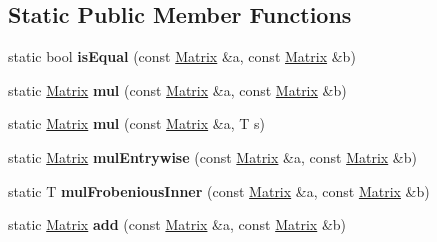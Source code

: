 \subsection*{Static Public Member Functions}
\begin{DoxyCompactItemize}
\item 
\hypertarget{classps_1_1base_1_1Matrix_a10b22b0d13369c4c9f5f882027a8916b}{}static bool {\bfseries is\+Equal} (const \hyperlink{classps_1_1base_1_1Matrix}{Matrix} \&a, const \hyperlink{classps_1_1base_1_1Matrix}{Matrix} \&b)\label{classps_1_1base_1_1Matrix_a10b22b0d13369c4c9f5f882027a8916b}

\item 
\hypertarget{classps_1_1base_1_1Matrix_ab540c9e3d4e67e7d09bd422b20585bdc}{}static \hyperlink{classps_1_1base_1_1Matrix}{Matrix} {\bfseries mul} (const \hyperlink{classps_1_1base_1_1Matrix}{Matrix} \&a, const \hyperlink{classps_1_1base_1_1Matrix}{Matrix} \&b)\label{classps_1_1base_1_1Matrix_ab540c9e3d4e67e7d09bd422b20585bdc}

\item 
\hypertarget{classps_1_1base_1_1Matrix_a48be2a8dd4b536d9ecaf2d755cbcdaf6}{}static \hyperlink{classps_1_1base_1_1Matrix}{Matrix} {\bfseries mul} (const \hyperlink{classps_1_1base_1_1Matrix}{Matrix} \&a, T s)\label{classps_1_1base_1_1Matrix_a48be2a8dd4b536d9ecaf2d755cbcdaf6}

\item 
\hypertarget{classps_1_1base_1_1Matrix_ad2344ec58c513d6a410bc021e194bdab}{}static \hyperlink{classps_1_1base_1_1Matrix}{Matrix} {\bfseries mul\+Entrywise} (const \hyperlink{classps_1_1base_1_1Matrix}{Matrix} \&a, const \hyperlink{classps_1_1base_1_1Matrix}{Matrix} \&b)\label{classps_1_1base_1_1Matrix_ad2344ec58c513d6a410bc021e194bdab}

\item 
\hypertarget{classps_1_1base_1_1Matrix_ae31ef8d82acb14fe6a165d311ea8a679}{}static T {\bfseries mul\+Frobenious\+Inner} (const \hyperlink{classps_1_1base_1_1Matrix}{Matrix} \&a, const \hyperlink{classps_1_1base_1_1Matrix}{Matrix} \&b)\label{classps_1_1base_1_1Matrix_ae31ef8d82acb14fe6a165d311ea8a679}

\item 
\hypertarget{classps_1_1base_1_1Matrix_aa68c052f6db96632e13fa471b57713c8}{}static \hyperlink{classps_1_1base_1_1Matrix}{Matrix} {\bfseries add} (const \hyperlink{classps_1_1base_1_1Matrix}{Matrix} \&a, const \hyperlink{classps_1_1base_1_1Matrix}{Matrix} \&b)\label{classps_1_1base_1_1Matrix_aa68c052f6db96632e13fa471b57713c8}


\end{DoxyCompactItemize}
